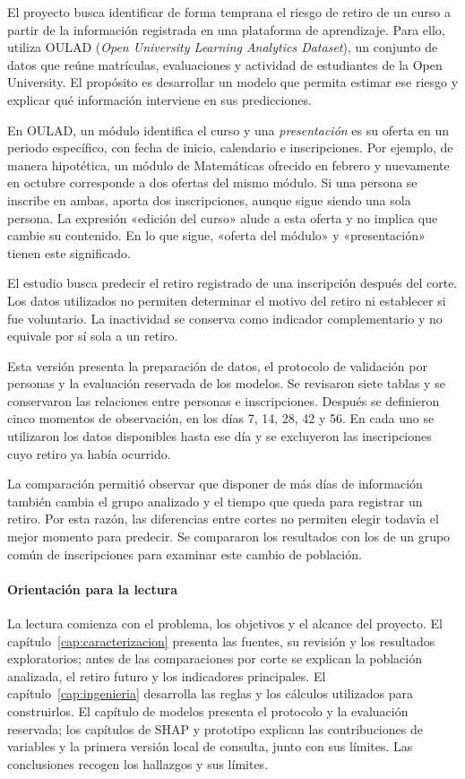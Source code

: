 El proyecto busca identificar de forma temprana el riesgo de retiro de un curso a partir de la información registrada en una plataforma de aprendizaje. Para ello, utiliza OULAD (\textit{Open University Learning Analytics Dataset}), un conjunto de datos que reúne matrículas, evaluaciones y actividad de estudiantes de la Open University. El propósito es desarrollar un modelo que permita estimar ese riesgo y explicar qué información interviene en sus predicciones.

En OULAD, un módulo identifica el curso y una \textit{presentación} es su oferta en un periodo específico, con fecha de inicio, calendario e inscripciones. Por ejemplo, de manera hipotética, un módulo de Matemáticas ofrecido en febrero y nuevamente en octubre corresponde a dos ofertas del mismo módulo. Si una persona se inscribe en ambas, aporta dos inscripciones, aunque sigue siendo una sola persona. La expresión «edición del curso» alude a esta oferta y no implica que cambie su contenido. En lo que sigue, «oferta del módulo» y «presentación» tienen este significado.

El estudio busca predecir el retiro registrado de una inscripción después del corte. Los datos utilizados no permiten determinar el motivo del retiro ni establecer si fue voluntario. La inactividad se conserva como indicador complementario y no equivale por sí sola a un retiro.

Esta versión presenta la preparación de datos, el protocolo de validación por personas y la evaluación reservada de los modelos. Se revisaron siete tablas y se conservaron las relaciones entre personas e inscripciones. Después se definieron cinco momentos de observación, en los días 7, 14, 28, 42 y 56. En cada uno se utilizaron los datos disponibles hasta ese día y se excluyeron las inscripciones cuyo retiro ya había ocurrido.

La comparación permitió observar que disponer de más días de información también cambia el grupo analizado y el tiempo que queda para registrar un retiro. Por esta razón, las diferencias entre cortes no permiten elegir todavía el mejor momento para predecir. Se compararon los resultados con los de un grupo común de inscripciones para examinar este cambio de población.

\paragraph{Orientación para la lectura}
La lectura comienza con el problema, los objetivos y el alcance del proyecto. El capítulo~\ref{cap:caracterizacion} presenta las fuentes, su revisión y los resultados exploratorios; antes de las comparaciones por corte se explican la población analizada, el retiro futuro y los indicadores principales. El capítulo~\ref{cap:ingenieria} desarrolla las reglas y los cálculos utilizados para construirlos. El capítulo de modelos presenta el protocolo y la evaluación reservada; los capítulos de SHAP y prototipo explican las contribuciones de variables y la primera versión local de consulta, junto con sus límites. Las conclusiones recogen los hallazgos y sus límites.

